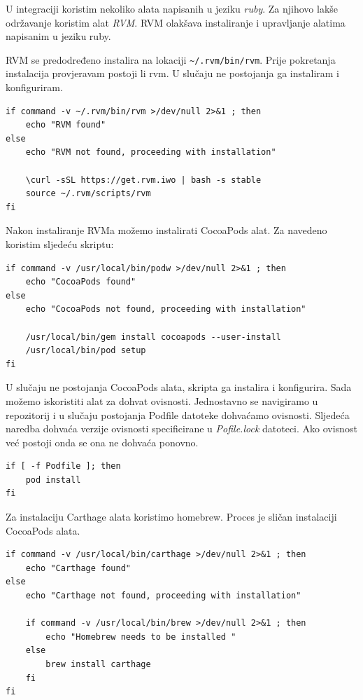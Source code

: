\documentclass[times, utf8, diplomski, numeric]{fer}
\begin{document}
\begin{appendices}
U integraciji koristim nekoliko alata napisanih u jeziku \textit{ruby}. Za njihovo lakše održavanje koristim alat \textit{RVM}. RVM olakšava instaliranje i upravljanje alatima napisanim u jeziku ruby.

RVM se predodređeno instalira na lokaciji \verb|~/.rvm/bin/rvm|. Prije pokretanja instalacija provjeravam postoji li rvm. U slučaju ne postojanja ga instaliram i konfiguriram.

\begin{verbatim}
if command -v ~/.rvm/bin/rvm >/dev/null 2>&1 ; then
    echo "RVM found"
else
    echo "RVM not found, proceeding with installation"

    \curl -sSL https://get.rvm.iwo | bash -s stable
    source ~/.rvm/scripts/rvm
fi
\end{verbatim}

Nakon instaliranje RVMa možemo instalirati CocoaPods alat. Za navedeno koristim sljedeću skriptu:

\begin{verbatim}
if command -v /usr/local/bin/podw >/dev/null 2>&1 ; then
    echo "CocoaPods found"
else
    echo "CocoaPods not found, proceeding with installation"

    /usr/local/bin/gem install cocoapods --user-install
    /usr/local/bin/pod setup
fi
\end{verbatim}

U slučaju ne postojanja CocoaPods alata, skripta ga instalira i konfigurira. Sada možemo iskoristiti alat za dohvat ovisnosti. Jednostavno se navigiramo u repozitorij i u slučaju postojanja Podfile datoteke dohvaćamo ovisnosti. Sljedeća naredba dohvaća verzije ovisnosti specificirane u \textit{Pofile.lock} datoteci. Ako ovisnost već postoji onda se ona ne dohvaća ponovno.

\begin{verbatim}
if [ -f Podfile ]; then
    pod install
fi
\end{verbatim}

Za instalaciju Carthage alata koristimo homebrew. Proces je sličan instalaciji CocoaPods alata.

\begin{verbatim}
if command -v /usr/local/bin/carthage >/dev/null 2>&1 ; then
    echo "Carthage found"
else
    echo "Carthage not found, proceeding with installation"

    if command -v /usr/local/bin/brew >/dev/null 2>&1 ; then
        echo "Homebrew needs to be installed "
    else
        brew install carthage
    fi
fi
\end{verbatim}


\end{appendices}
\end{document}
